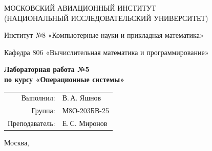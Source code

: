 \begin{titlepage}
\begin{center}
\large
МОСКОВСКИЙ АВИАЦИОННЫЙ ИНСТИТУТ\\
(НАЦИОНАЛЬНЫЙ ИССЛЕДОВАТЕЛЬСКИЙ УНИВЕРСИТЕТ)

\vspace{20pt}

Институт №8 «Компьютерные науки и прикладная математика»

Кафедра 806 «Вычислительная математика и программирование»
\end{center}

\vspace{60pt}

\begin{center}
\large\bfseries
Лабораторная работа №5\\
по курсу «Операционные системы»
\end{center}

\vfill

\begin{flushright}
\large
\begin{tabular}{rl}
Выполнил: & В.\,А. Яшнов \\
Группа: & М8О-203БВ-25 \\
Преподаватель: & Е.\,С. Миронов \\
\end{tabular}
\end{flushright}

\vspace{92pt}
\begin{center}
\large
Москва, \the\year
\end{center}
\end{titlepage}
